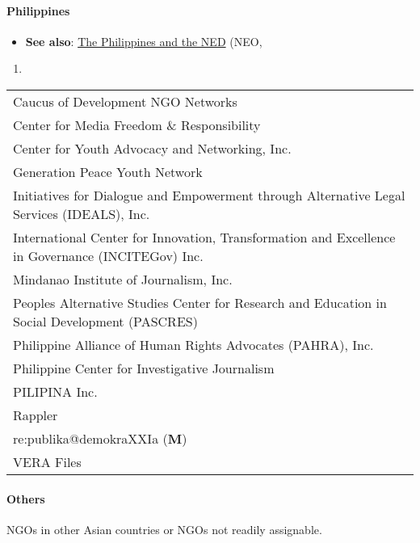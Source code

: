 \hypertarget{philippines}{%
\paragraph{Philippines}\label{philippines}}

\begin{itemize}
\tightlist
\item
  \textbf{See also}:
  \href{https://journal-neo.org/2019/06/21/us-ned-funded-meddling-exposed-in-the-philippines/}{The
  Philippines and the NED} (NEO,
\end{itemize}

\begin{enumerate}
\def\labelenumi{\arabic{enumi})}
\setcounter{enumi}{2018}
\item
\end{enumerate}

\begin{longtable}[]{@{}l@{}}
\toprule
\endhead
Caucus of Development NGO Networks\tabularnewline
Center for Media Freedom \& Responsibility\tabularnewline
Center for Youth Advocacy and Networking, Inc.\tabularnewline
Generation Peace Youth Network\tabularnewline
Initiatives for Dialogue and Empowerment through Alternative Legal
Services (IDEALS), Inc.\tabularnewline
International Center for Innovation, Transformation and Excellence in
Governance (INCITEGov) Inc.\tabularnewline
Mindanao Institute of Journalism, Inc.\tabularnewline
Peoples Alternative Studies Center for Research and Education in Social
Development (PASCRES)\tabularnewline
Philippine Alliance of Human Rights Advocates (PAHRA),
Inc.\tabularnewline
Philippine Center for Investigative Journalism\tabularnewline
PILIPINA Inc.\tabularnewline
Rappler\tabularnewline
re:publika@demokraXXIa (\textbf{M})\tabularnewline
VERA Files\tabularnewline
\bottomrule
\end{longtable}

\hypertarget{others-1}{%
\paragraph{Others}\label{others-1}}

NGOs in other Asian countries or NGOs not readily assignable.

